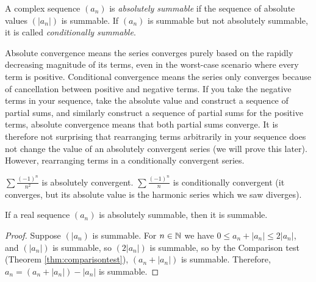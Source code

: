 \documentclass[../analysis1.tex]{subfiles}
\begin{document}
\begin{definition}
    \begin{shaded*}
        A complex sequence $(a_n)$ is \textit{absolutely summable} if the sequence of absolute values $\left(|a_n|\right)$ is summable. 
        If $(a_n)$ is summable but not absolutely summable, it is called \textit{conditionally summable}.
    \end{shaded*}
\end{definition}

\begin{remark}
    Absolute convergence means the series converges purely based on the rapidly decreasing magnitude of its terms, even in the worst-case scenario where every term is positive. Conditional convergence means the series only converges because of cancellation between positive and negative terms. If you take the negative terms in your sequence, take the absolute value and construct a sequence of partial sums, and similarly construct a sequence of partial sums for the positive terms, absolute convergence means that both partial sums converge. It is therefore not surprising that rearranging terms arbitrarily in your sequence does not change the value of an absolutely convergent series (we will prove this later). However, rearranging terms in a conditionally convergent series.
\end{remark}
\begin{example}
    $\sum \frac{(-1)^n}{n^2}$ is absolutely convergent. $\sum \frac{(-1)^n}{n}$ is conditionally convergent (it converges, but its absolute value is the harmonic series which we saw diverges).
\end{example}

\begin{theorem}
    \begin{shaded*}
        If a real sequence $(a_n)$ is absolutely summable, then it is summable.
    \end{shaded*}
\end{theorem}

\begin{proof}
    Suppose $(|a_n)$ is summable. For $n\in\mathbb{N}$ we have $0\le a_n+|a_n|\le 2|a_n|$, and $(|a_n|)$ is summable, so $(2|a_n|)$ is summable, so by the Comparison test (Theorem \ref{thm:comparisontest}), $(a_n+|a_n|)$ is summable. Therefore, $a_n=(a_n+|a_n|)-|a_n|$ is summable.\qedhere
\end{proof}
\end{document}
